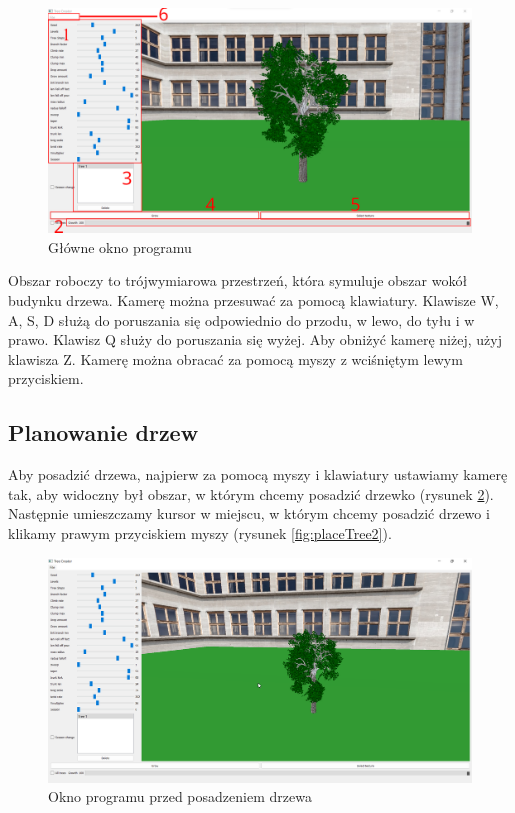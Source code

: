 \documentclass[a4paper,12pt,twoside]{book} %
\begin{document}
\begin{figure}[H]
	\centering\includegraphics[width=15.5cm]{grafika/program/main2.png}
	\caption{Główne okno programu}
    \label{fig:screenmainwindow}
\end{figure}

Obszar roboczy to trójwymiarowa przestrzeń, która symuluje obszar 
wokół budynku drzewa. Kamerę można przesuwać za pomocą klawiatury. 
Klawisze W, A, S, D służą do poruszania się odpowiednio do przodu, 
w lewo, do tyłu i w prawo. Klawisz Q służy do poruszania się wyżej. 
Aby obniżyć kamerę niżej, użyj klawisza Z. 
Kamerę można obracać za pomocą myszy z wciśniętym lewym przyciskiem.  


\subsection{Planowanie drzew}

Aby posadzić drzewa, najpierw za pomocą myszy i klawiatury 
ustawiamy kamerę tak, aby widoczny był obszar, w którym chcemy 
posadzić drzewko (rysunek \ref{fig:placeTree}). Następnie umieszczamy kursor w miejscu, w którym 
chcemy posadzić drzewo i klikamy prawym przyciskiem myszy (rysunek \ref{fig:placeTree2}).


\begin{figure}[H]
	\centering\includegraphics[width=15.5cm]{grafika/program/placeTree.png}
	\caption{Okno programu przed posadzeniem drzewa}
    \label{fig:placeTree}
\end{figure}
\end{document}
